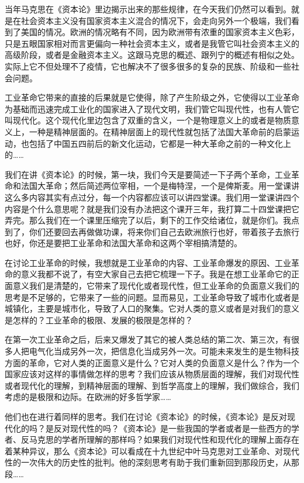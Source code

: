 \documentclass[UTF8, 12pt, a4paper]{ctexrep}
\begin{document}
当年马克思在《资本论》里边揭示出来的那些规律，在今天我们仍然可以看到。就是在社会资本主义没有国家资本主义混合的情况下，会走向另外一个极端，我们看到了美国的情况。欧洲的情况略有不同，因为欧洲带有浓重的国家资本主义色彩，只是五眼国家相对而言更偏向一种社会资本主义，或者是我管它叫社会资本主义的高级阶段，或者是金融资本主义。这跟马克思的概述、跟列宁的概述有相似之处。实际上它不但处理不了疫情，它也解决不了很多很多的复杂的民族、阶级和一些社会问题。

工业革命它带来的直接的后果就是它使得，除了产生阶级之外，它使得以工业革命为基础而迅速完成工业化的国家进入了现代文明，我们管它叫现代性，也有人管它叫现代化。这个现代化里边包含了双重的含义，一个是物理意义上的或者是物质意义上，一种是精神层面的。在精神层面上的现代性就包括了法国大革命前的启蒙运动，也包括了中国五四前后的新文化运动，它都是一种大革命之前的一种文化上的……

我们在讲《资本论》的时候，第一块，我们今天是要简述一下子两个革命，工业革命和法国大革命；然后简述两位宰相，一个是梅特涅，一个是俾斯麦。用一堂课讲这么多内容其实有点过分，每一个内容都应该可以讲四堂课。我们用一堂课讲四个内容是个什么意思呢？就是我们没有办法把这个课开三年，我打算二十四堂课把它弄完。那么我们在一个课里压缩完了以后，剩下的工作交给诸位，就是你们。我点到了，你们还要回去再做做功课，将来你们自己去欧洲旅行也好，带着孩子去旅行也好，你还是要把工业革命和法国大革命和这两个宰相搞清楚的。

在讨论工业革命的时候，我想就是工业革命的内容、工业革命爆发的原因、工业革命的意义我都不说了，有空大家自己去把它梳理一下子。我是在想工业革命它的正面意义我们是清楚的，它带来了现代化或者现代性，但工业革命的负面意义我们的思考是不足够的，它带来了一些的问题。显而易见，工业革命导致了城市化或者是城镇化，主要是城市化，导致了人口的聚集。它对人类的意义或者是对我们的意义是怎样的？工业革命的极限、发展的极限是怎样的？

在第一次工业革命之后，后来又爆发了其它的被人类总结的第二次、第三次，有很多人把电气化当成另外一次，把信息化当成另外一次。可能未来发生的是生物科技方面的革命，它对人类的正面意义是什么？它对人类的负面意义是什么？作为一个国家应该对这样的事情做怎样的思考？我们应该从物质层面的理解，我们对现代性或者现代化的理解，到精神层面的理解、到哲学高度上的理解，我们做综合，我们考虑的是极限和边际。在欧洲的好多哲学家……

他们也在进行着同样的思考。我们在讨论《资本论》的时候，《资本论》是反对现代化的吗？是反对现代性的吗？《资本论》是一些我国的学者或者是一些西方的学者、反马克思的学者所理解的那样吗？如果我们对现代性和现代化的理解上面存在着某种异议，那么《资本论》可以看成在十九世纪中叶马克思对工业革命、对现代性的一次伟大的历史性的批判。他的深刻思考有助于我们重新回到那段历史，从那段……
\end{document}
